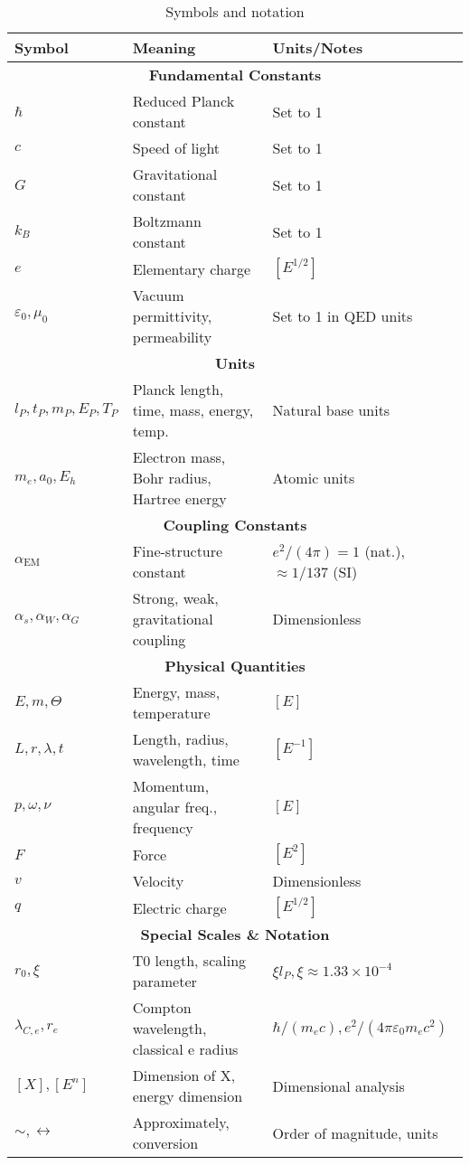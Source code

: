 \documentclass[11pt,a4paper]{article}
\begin{document}
	{\small
		\begin{table}[htbp]
			\centering
			\begin{adjustbox}{width=0.98\textwidth}
				\begin{tabular}{lll}
					\toprule
					\textbf{Symbol} & \textbf{Meaning} & \textbf{Units/Notes} \\
					\midrule
					\multicolumn{3}{c}{\textbf{Fundamental Constants}} \\
					$\hbar$ & Reduced Planck constant & Set to 1 \\
					$c$ & Speed of light & Set to 1 \\
					$G$ & Gravitational constant & Set to 1 \\
					$k_B$ & Boltzmann constant & Set to 1 \\
					$e$ & Elementary charge & $[E^{1/2}]$ \\
					$\varepsilon_0, \mu_0$ & Vacuum permittivity, permeability & Set to 1 in QED units \\
					\midrule
					\multicolumn{3}{c}{\textbf{Units}} \\
					$l_P, t_P, m_P, E_P, T_P$ & Planck length, time, mass, energy, temp. & Natural base units \\
					$m_e, a_0, E_h$ & Electron mass, Bohr radius, Hartree energy & Atomic units \\
					\midrule
					\multicolumn{3}{c}{\textbf{Coupling Constants}} \\
					$\alpha_{\text{EM}}$ & Fine-structure constant & $e^2/(4\pi) = 1$ (nat.), $\approx 1/137$ (SI) \\
					$\alpha_s, \alpha_W, \alpha_G$ & Strong, weak, gravitational coupling & Dimensionless \\
					\midrule
					\multicolumn{3}{c}{\textbf{Physical Quantities}} \\
					$E, m, \Theta$ & Energy, mass, temperature & $[E]$ \\
					$L, r, \lambda, t$ & Length, radius, wavelength, time & $[E^{-1}]$ \\
					$p, \omega, \nu$ & Momentum, angular freq., frequency & $[E]$ \\
					$F$ & Force & $[E^2]$ \\
					$v$ & Velocity & Dimensionless \\
					$q$ & Electric charge & $[E^{1/2}]$ \\
					\midrule
					\multicolumn{3}{c}{\textbf{Special Scales \& Notation}} \\
					$r_0, \xi$ & T0 length, scaling parameter & $\xi l_P, \xi \approx 1.33 \times 10^{-4}$ \\
					$\lambda_{C,e}, r_e$ & Compton wavelength, classical e radius & $\hbar/(m_e c), e^2/(4\pi\varepsilon_0 m_e c^2)$ \\
					$[X], [E^n]$ & Dimension of X, energy dimension & Dimensional analysis \\
					$\sim, \leftrightarrow$ & Approximately, conversion & Order of magnitude, units \\
					\bottomrule
				\end{tabular}
			\end{adjustbox}
			\caption{Symbols and notation}
			\label{tab:symbols}
		\end{table}
	}
	
\end{document}
